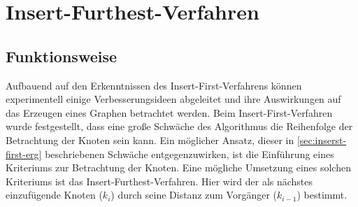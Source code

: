 \section{Insert-Furthest-Verfahren} \label{sec:insert-furthest-verfahren}
\subsection{Funktionsweise} \label{sec:insert-furthest-funkt}
Aufbauend auf den Erkenntnissen des Insert-First-Verfahrens können experimentell einige Verbesserungsideen abgeleitet und ihre Auswirkungen auf das Erzeugen eines Graphen betrachtet werden.
Beim Insert-First-Verfahren wurde festgestellt, dass eine große Schwäche des Algorithmus die Reihenfolge der Betrachtung der Knoten sein kann.
Ein möglicher Ansatz, dieser in \vref{sec:inserst-first-erg} beschriebenen Schwäche entgegenzuwirken, ist die Einführung eines Kriteriums zur Betrachtung der Knoten.
Eine mögliche Umsetzung eines solchen Kriteriums ist das Insert-Furthest-Verfahren. 
Hier wird der als nächstes einzufügende Knoten ($k_i$) durch seine Distanz zum Vorgänger ($k_{i-1}$) bestimmt.


